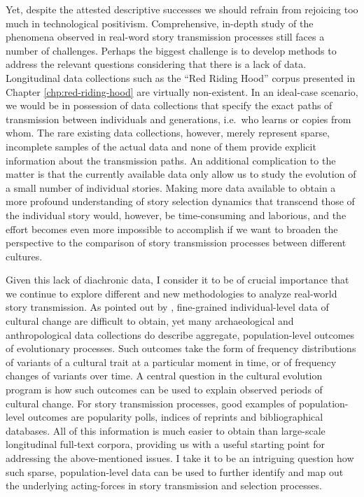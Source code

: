 Yet, despite the attested descriptive successes we should refrain from rejoicing too much in technological positivism. Comprehensive, in-depth study of the phenomena observed in real-word story transmission processes still faces a number of challenges. Perhaps the biggest challenge is to develop methods to address the relevant questions considering that there is a lack of data. Longitudinal data collections such as the ``Red Riding Hood'' corpus presented in Chapter \ref{chp:red-riding-hood} are virtually non-existent. In an ideal-case scenario, we would be in possession of data collections that specify the exact paths of transmission between individuals and generations, i.e.\ who learns or copies from whom\autocite{kandler:2015}. The rare existing data collections, however, merely represent sparse, incomplete samples of the actual data and none of them provide explicit information about the transmission paths. An additional complication to the matter is that the currently available data only allow us to study the evolution of a small number of individual stories. Making more data available to obtain a more profound understanding of story selection dynamics that transcend those of the individual story would, however, be time-consuming and laborious, and the effort becomes even more impossible to accomplish if we want to broaden the perspective to the comparison of story transmission processes between different cultures.

Given this lack of diachronic data, I consider it to be of crucial importance that we continue to explore different and new methodologies to analyze real-world story transmission. As pointed out by \citeauthor{kandler:2015}, fine-grained individual-level data of cultural change are difficult to obtain, yet many archaeological and anthropological data collections do describe aggregate, population-level outcomes of evolutionary processes.\autocite{kandler:2015} Such outcomes take the form of frequency distributions of variants of a cultural trait at a particular moment in time, or of frequency changes of variants over time. A central question in the cultural evolution program is how such outcomes can be used to explain observed periods of cultural change\autocite{Mesoudi:2009,kandler:2015,kandler:2015b}. For story transmission processes, good examples of population-level outcomes are popularity polls, indices of reprints and bibliographical databases\autocite{koman:2008,joosen:2014}. All of this information is much easier to obtain than large-scale longitudinal full-text corpora, providing us with a useful starting point for addressing the above-mentioned issues. I take it to be an intriguing question how such sparse, population-level data can be used to further identify and map out the underlying acting-forces in story transmission and selection processes.

